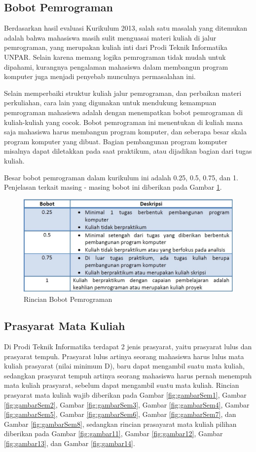 \subsection{Bobot Pemrograman}
Berdasarkan hasil evaluasi Kurikulum 2013, salah satu masalah yang ditemukan adalah bahwa mahasiswa masih sulit menguasai materi kuliah di jalur pemrograman, yang merupakan kuliah inti dari Prodi Teknik Informatika UNPAR. Selain karena memang logika pemrograman tidak mudah untuk dipahami, kurangnya pengalaman mahasiswa dalam membangun program komputer juga menjadi penyebab munculnya permasalahan ini. \cite{kurikulum:2018}

Selain memperbaiki struktur kuliah jalur pemrograman, dan perbaikan materi perkuliahan, cara lain yang digunakan untuk mendukung kemampuan pemrograman mahasiswa adalah dengan menempatkan bobot pemrograman di kuliah-kuliah yang cocok. Bobot pemrograman ini menentukan di kuliah mana saja mahasiswa harus membangun program komputer, dan seberapa besar skala program komputer yang
dibuat. Bagian pembangunan program komputer misalnya dapat diletakkan pada saat praktikum, atau dijadikan bagian dari tugas kuliah.

Besar bobot pemrograman dalam kurikulum ini adalah 0.25, 0.5, 0.75, dan 1. Penjelasan terkait masing - masing
bobot ini diberikan pada Gambar \ref{fig:gambar3}.

\begin{figure}[H]
    \centering
    \includegraphics[width=12cm, height=5cm]{Gambar/Bobot Pemorgraman .jpg}
    \caption{Rincian Bobot Pemrograman}
    \label{fig:gambar3}
\end{figure}

\subsection{Prasyarat Mata Kuliah}
Di Prodi Teknik Informatika terdapat 2 jenis prasyarat, yaitu prasyarat lulus dan prasyarat tempuh. Prasyarat lulus artinya seorang mahasiswa harus lulus mata kuliah prasyarat (nilai minimum D), baru dapat mengambil suatu mata kuliah, sedangkan prasyarat tempuh artinya seorang mahasiswa harus pernah menempuh mata kuliah prasyarat, sebelum dapat mengambil suatu mata kuliah. Rincian prasyarat mata kuliah wajib diberikan pada Gambar \ref{fig:gambarSem1}, Gambar \ref{fig:gambarSem2}, Gambar \ref{fig:gambarSem3}, Gambar \ref{fig:gambarSem4}, Gambar \ref{fig:gambarSem5}, Gambar \ref{fig:gambarSem6}, Gambar \ref{fig:gambarSem7}, dan Gambar \ref{fig:gambarSem8}, sedangkan rincian prasayarat mata kuliah pilihan diberikan pada Gambar \ref{fig:gambar11}, Gambar \ref{fig:gambar12}, Gambar \ref{fig:gambar13}, dan Gambar \ref{fig:gambar14}.

